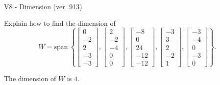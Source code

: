 \begin{exercise}
  \begin{exerciseTitle}V8 - Dimension (ver. 913)\end{exerciseTitle}
  \begin{exerciseStatement}
    Explain how to find the dimension of 
\[W=\mathrm{span}\ \left\{\left[\begin{array}{r}
0 \\
-2 \\
2 \\
-3 \\
-3
\end{array}\right] , \left[\begin{array}{r}
2 \\
-2 \\
-4 \\
0 \\
0
\end{array}\right] , \left[\begin{array}{r}
-8 \\
0 \\
24 \\
-12 \\
-12
\end{array}\right] , \left[\begin{array}{r}
-3 \\
3 \\
2 \\
-2 \\
1
\end{array}\right] , \left[\begin{array}{r}
-3 \\
-4 \\
0 \\
-3 \\
0
\end{array}\right]\right\}.\]



  \end{exerciseStatement}
  \begin{exerciseAnswer}
   The dimension of \(W\) is  \(4\).
  


  \end{exerciseAnswer}
\end{exercise}